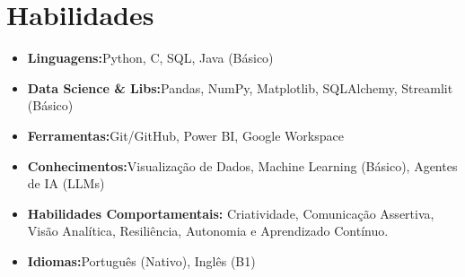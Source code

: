 \documentclass[a4paper,10pt]{article}
\begin{document}
\section{Habilidades}
    \begin{itemize}
        \item{\textbf{Linguagens:}Python, C, SQL, Java (Básico)}
        \item{\textbf{Data Science \& Libs:}Pandas, NumPy, Matplotlib, SQLAlchemy, Streamlit (Básico)} 
        \item{\textbf{Ferramentas:}Git/GitHub, Power BI, Google Workspace}
        \item{\textbf{Conhecimentos:}Visualização de Dados, Machine Learning (Básico), Agentes de IA (LLMs)}
        \item{\textbf{Habilidades Comportamentais:} Criatividade, Comunicação Assertiva, Visão Analítica, Resiliência, Autonomia e Aprendizado Contínuo.}
        \item{\textbf{Idiomas:}Português (Nativo), Inglês (B1)} 
    \end{itemize}
\end{document}
